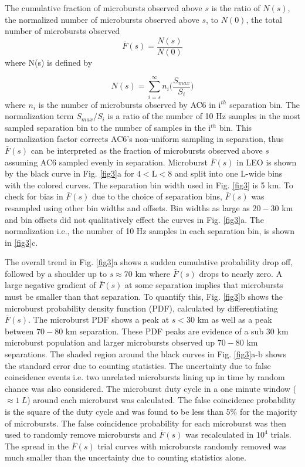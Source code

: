 \documentclass[draft]{agujournal2019}
\begin{document}
The cumulative fraction of microbursts observed above $s$ is the ratio of $N(s)$, the normalized number of microbursts observed above $s$, to $N(0)$, the total number of microbursts observed 
\begin{equation}
\bar{F}(s) = \frac{N(s)}{N(0)}
\end{equation} where N(s) is defined by

\begin{equation}
N(s) = \sum_{i = s}^\infty n_{i} \Big( \frac{S_{max}}{S_{i}} \Big)
\end{equation} where $n_{i}$ is the number of microbursts observed by AC6 in i$^{th}$ separation bin. The normalization term $S_{max}/S_{i}$ is a ratio of the number of 10 Hz samples in the most sampled separation bin to the number of samples in the i$^{th}$ bin. This normalization factor corrects AC6's non-uniform sampling in separation, thus $\bar{F}(s)$ can be interpreted as the fraction of microbursts observed above $s$ assuming AC6 sampled evenly in separation. Microburst $\bar{F}(s)$ in LEO is shown by the black curve in Fig. \ref{fig3}a for $4 < \mathrm{L}< 8$ and split into one L-wide bins with the colored curves. The separation bin width used in Fig. \ref{fig3} is 5 km. To check for bias in $\bar{F}(s)$ due to the choice of separation bins, $\bar{F}(s)$ was resampled using other bin widths and offsets. Bin widths as large as $20-30$ km and bin offsets did not qualitatively effect the curves in Fig. \ref{fig3}a. The normalization i.e., the number of 10 Hz samples in each separation bin, is shown in \ref{fig3}c.

The overall trend in Fig. \ref{fig3}a shows a sudden cumulative probability drop off, followed by a shoulder up to $s \approx 70$ km where $\bar{F}(s)$ drops to nearly zero. A large negative gradient of $\bar{F}(s)$ at some separation implies that microbursts must be smaller than that separation. To quantify this, Fig. \ref{fig3}b shows the microburst probability density function (PDF), calculated by differentiating $\bar{F}(s)$. The microburst PDF shows a peak at $s < 30$ km as well as a peak between $70-80$ km separation. These PDF peaks are evidence of a sub $30$ km microburst population and larger microbursts observed up $70-80$ km separations. The shaded region around the black curves in Fig. \ref{fig3}a-b shows the standard error due to counting statistics. The uncertainty due to false coincidence events i.e. two unrelated microbursts lining up in time by random chance was also considered. The microburst duty cycle in a one minute window ($\approx 1 \ L$) around each microburst was calculated. The false coincidence probability is the square of the duty cycle and was found to be less than 5\% for the majority of microbursts. The false coincidence probability for each microburst was then used to randomly remove microbursts and $\bar{F}(s)$ was recalculated in $10^4$ trials. The spread in the $\bar{F}(s)$ trial curves with microbursts randomly removed was much smaller than the uncertainty due to counting statistics alone.
\end{document}
